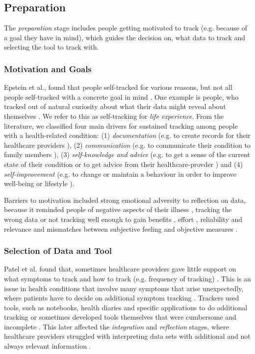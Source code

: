 \subsection{Preparation} 
The \textit{preparation} stage includes people getting motivated to track (e.g. because of a goal they have in mind), which guides the decision on, what data to track and selecting the tool to track with. 

\subsubsection{Motivation and Goals} 
Epstein et al., found that people self-tracked for various reasons, but not all people self-tracked with a concrete goal in mind \cite{Epstein2015}. One example is people, who tracked out of natural curiosity about what their data might reveal about themselves \cite{Li2010, Epstein2015}. We refer to this as self-tracking for \textit{life experience}. From the literature, we classified four main drivers for sustained tracking among people with a health-related condition: (1) \textit{documentation} (e.g. to create records for their healthcare providers \cite{Ancker2015}), (2) \textit{communication} (e.g. to communicate their condition to family members \cite{MacLeod2014}), (3) \textit{self-knowledge and advice} (e.g. to get a sense of the current state of their condition or to get advice from their healthcare-provder \cite{MacLeod2014, Ancker2015}) and (4) \textit{self-improvement} (e.g. to change or maintain a behaviour in order to improve well-being or lifestyle \cite{MacLeod2014, Ancker2015, Chung2016}).

Barriers to motivation included strong emotional adversity to reflection on data, because it reminded people of negative aspects of their illness \cite{Li2010, Ancker2015}, tracking the wrong data or not tracking well enough to gain benefits \cite{Chung2015}, effort \cite{Choe2014, Patel2012}, reliability and relevance \cite{Oh2015, piloting, Epstein2015} and mismatches between subjective feeling and objective measures \cite{Ancker2015}. 

\subsubsection{Selection of Data and Tool} 
Patel et al. found that, sometimes healthcare providers gave little support on what symptoms to track and how to track (e.g. frequency of tracking) \cite{Patel2012}. This is an issue in health conditions that involve many symptoms that arise unexpectedly, where patients have to decide on additional symptom tracking \cite{Patel2012, Chung2016}. Trackers used tools, such as notebooks, health diaries and specific applications to do additional tracking or sometimes developed tools themselves that were cumbersome and incomplete \cite{Patel2012}. This later affected the \textit{integration} and \textit{reflection} stages, where healthcare providers struggled with interpreting data sets with additional and not always relevant information \cite{Chung2015, Chung2016}.

